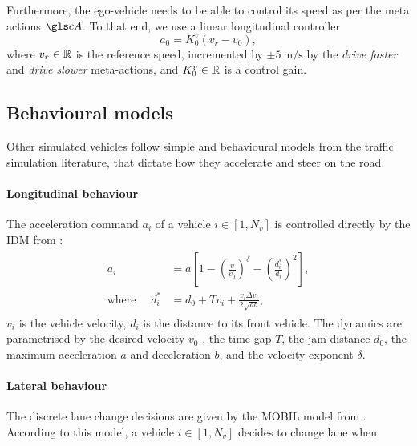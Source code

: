 Furthermore, the ego-vehicle needs to be able to control its speed as per the meta actions $\cA$. To that end, we use a linear longitudinal controller
\begin{equation*}
a_0 = K_0^v(v_r - v_0),
\end{equation*}
where $v_r\in\mathbb{R}$ is the reference speed, incremented by $\pm \SI[per-mode=symbol]{5}{\meter\per\second}$ by the \emph{drive faster} and \emph{drive slower} meta-actions, and $K_0^v\in\mathbb{R}$ is a control gain.

\subsection{Behavioural models}

Other simulated vehicles follow simple and behavioural models from the traffic simulation literature, that dictate how they accelerate and steer on the road.

\paragraph{Longitudinal behaviour}

The acceleration command $a_i$ of a vehicle $i\in[1, N_v]$ is controlled directly by the \gls{IDM} from \citep{Treiber2000}:
\begin{align}
\begin{split}
a_i &= a\left[1-\left(\frac{v}{v_0}\right)^\delta - \left(\frac{d^*_i}{d_i}\right)^2\right], \\
\text{where }\quad d^*_i &= d_0 + Tv_i + \frac{v_i\Delta v_i}{2\sqrt{ab}},
\end{split}
\end{align}
$v_i$ is the vehicle velocity, $d_i$ is the distance to its front vehicle.
The dynamics are parametrised by the desired velocity $v_0$ , the time gap $T$, the jam distance $d_0$, the maximum acceleration $a$ and deceleration $b$, and the velocity exponent $\delta$.

\paragraph{Lateral behaviour}

The discrete lane change decisions are given by the \gls{MOBIL} model from \citep{Kesting2007}.
According to this model, a vehicle $i\in[1, N_v]$ decides to change lane when


